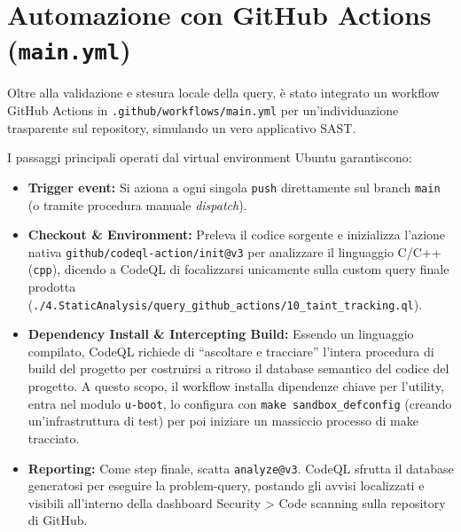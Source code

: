 \section{Automazione con GitHub Actions (\texttt{main.yml})}

Oltre alla validazione e stesura locale della query, è stato integrato un workflow GitHub Actions in \texttt{.github/workflows/main.yml} per un'individuazione trasparente sul repository, simulando un vero applicativo SAST. 

I passaggi principali operati dal virtual environment Ubuntu garantiscono:
\begin{itemize}
  \item \textbf{Trigger event:} Si aziona a ogni singola \texttt{push} direttamente sul branch \texttt{main} (o tramite procedura manuale \textit{dispatch}).
  \item \textbf{Checkout \& Environment:} Preleva il codice sorgente e inizializza l'azione nativa \texttt{github/codeql-action/init@v3} per analizzare il linguaggio C/C++ (\texttt{cpp}), dicendo a CodeQL di focalizzarsi unicamente sulla custom query finale prodotta (\texttt{./4.StaticAnalysis/query\_github\_actions/10\_taint\_tracking.ql}).
  \item \textbf{Dependency Install \& Intercepting Build:} Essendo un linguaggio compilato, CodeQL richiede di ``ascoltare e tracciare'' l'intera procedura di build del progetto per costruirsi a ritroso il database semantico del codice del progetto. A questo scopo, il workflow installa dipendenze chiave per l'utility, entra nel modulo \texttt{u-boot}, lo configura con \texttt{make sandbox\_defconfig} (creando un'infrastruttura di test) per poi iniziare un massiccio processo di make tracciato.
  \item \textbf{Reporting:} Come step finale, scatta \texttt{analyze@v3}. CodeQL sfrutta il database generatosi per eseguire la problem-query, postando gli avvisi localizzati e visibili all'interno della dashboard Security > Code scanning sulla repository di GitHub.
\end{itemize}